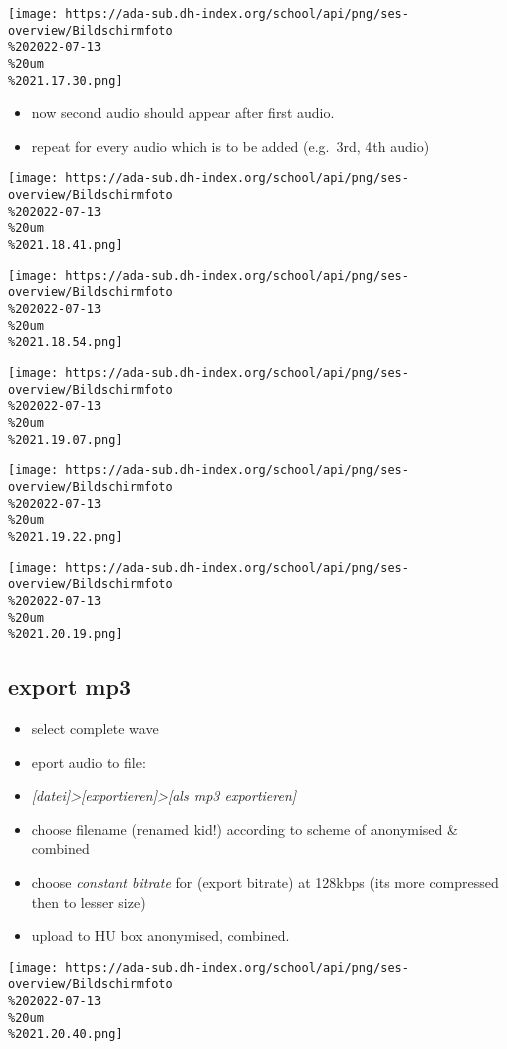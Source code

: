 \documentclass[
  12pt,
]{article}
\providecommand{\tightlist}{%
  \setlength{\itemsep}{0pt}\setlength{\parskip}{0pt}}
\begin{document}
\texttt{[image: https://ada-sub.dh-index.org/school/api/png/ses-overview/Bildschirmfoto\\\%202022-07-13\\\%20um\\\%2021.17.30.png]}

\begin{itemize}
\tightlist
\item
  now second audio should appear after first audio.
\item
  repeat for every audio which is to be added (e.g.~3rd, 4th audio)
\end{itemize}

\texttt{[image: https://ada-sub.dh-index.org/school/api/png/ses-overview/Bildschirmfoto\\\%202022-07-13\\\%20um\\\%2021.18.41.png]}

\texttt{[image: https://ada-sub.dh-index.org/school/api/png/ses-overview/Bildschirmfoto\\\%202022-07-13\\\%20um\\\%2021.18.54.png]}

\texttt{[image: https://ada-sub.dh-index.org/school/api/png/ses-overview/Bildschirmfoto\\\%202022-07-13\\\%20um\\\%2021.19.07.png]}

\texttt{[image: https://ada-sub.dh-index.org/school/api/png/ses-overview/Bildschirmfoto\\\%202022-07-13\\\%20um\\\%2021.19.22.png]}

\texttt{[image: https://ada-sub.dh-index.org/school/api/png/ses-overview/Bildschirmfoto\\\%202022-07-13\\\%20um\\\%2021.20.19.png]}

\hypertarget{export-mp3}{%
\subsection{export mp3}\label{export-mp3}}

\begin{itemize}
\tightlist
\item
  select complete wave
\item
  eport audio to file:
\item
  \emph{{[}datei{]}\textgreater{[}exportieren{]}\textgreater{[}als mp3
  exportieren{]}}
\item
  choose filename (renamed kid!) according to scheme of anonymised \&
  combined
\item
  choose \emph{constant bitrate} for (export bitrate) at 128kbps (its
  more compressed then to lesser size)
\item
  upload to HU box anonymised, combined.
\end{itemize}

\texttt{[image: https://ada-sub.dh-index.org/school/api/png/ses-overview/Bildschirmfoto\\\%202022-07-13\\\%20um\\\%2021.20.40.png]}
\end{document}
